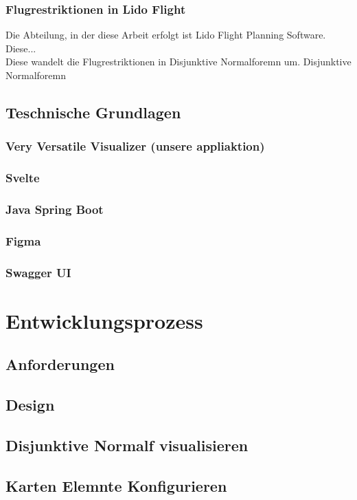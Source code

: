 \documentclass[a4paper,12pt]{article}
\begin{document}
 \subsubsection{Flugrestriktionen in Lido Flight}

Die Abteilung, in der diese Arbeit erfolgt ist Lido Flight Planning Software. Diese... \\
Diese wandelt die Flugrestriktionen in Disjunktive Normalforemn um. Disjunktive Normalforemn 
\subsection{Teschnische Grundlagen}
\subsubsection{Very Versatile Visualizer (unsere appliaktion)}
\subsubsection{Svelte}
\subsubsection{Java Spring Boot}
\subsubsection{Figma}
\subsubsection{Swagger UI}
\newpage
\section{Entwicklungsprozess}
\subsection{Anforderungen}
\subsection{Design}
\subsection{Disjunktive Normalf visualisieren}
\subsection{Karten Elemnte Konfigurieren}
\newpage
\end{document}
